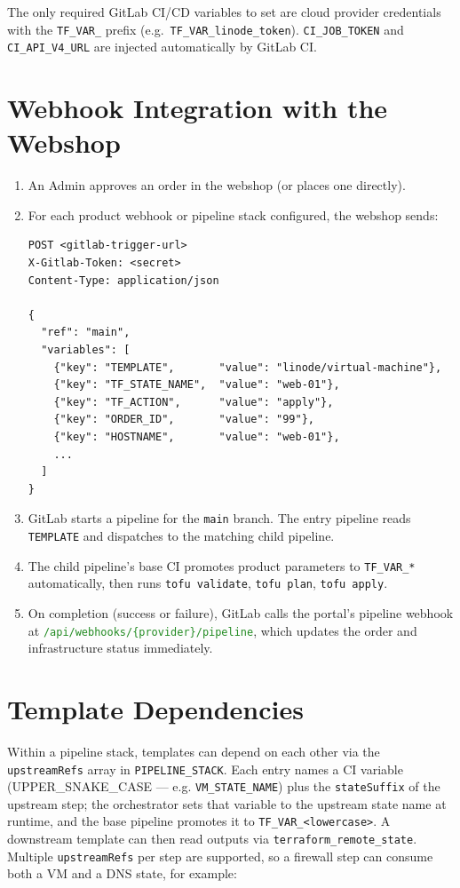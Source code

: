 \documentclass[12pt,a4paper,twoside]{report}
\newcommand{\notebox}[1]{\begin{tcolorbox}[noteboxstyle]#1\end{tcolorbox}}
\newcommand{\code}[1]{\texttt{#1}}
\newcommand{\route}[1]{\texttt{\textcolor{ForestGreen}{#1}}}
\begin{document}
\notebox{The only required GitLab CI/CD variables to set are cloud
provider credentials with the \code{TF\_VAR\_} prefix
(e.g.\ \code{TF\_VAR\_linode\_token}). \code{CI\_JOB\_TOKEN} and
\code{CI\_API\_V4\_URL} are injected automatically by GitLab CI.}

\section{Webhook Integration with the Webshop}
\label{sec:webhook}

\begin{enumerate}
  \item An Admin approves an order in the webshop (or places one
        directly).
  \item For each product webhook or pipeline stack configured, the
        webshop sends:
\begin{lstlisting}[style=bash]
POST <gitlab-trigger-url>
X-Gitlab-Token: <secret>
Content-Type: application/json

{
  "ref": "main",
  "variables": [
    {"key": "TEMPLATE",       "value": "linode/virtual-machine"},
    {"key": "TF_STATE_NAME",  "value": "web-01"},
    {"key": "TF_ACTION",      "value": "apply"},
    {"key": "ORDER_ID",       "value": "99"},
    {"key": "HOSTNAME",       "value": "web-01"},
    ...
  ]
}
\end{lstlisting}
  \item GitLab starts a pipeline for the \code{main} branch.
        The entry pipeline reads \code{TEMPLATE} and dispatches to the
        matching child pipeline.
  \item The child pipeline's base CI promotes product parameters to
        \code{TF\_VAR\_*} automatically, then runs
        \code{tofu validate}, \code{tofu plan}, \code{tofu apply}.
  \item On completion (success or failure), GitLab calls the portal's
        pipeline webhook at
        \route{/api/webhooks/\{provider\}/pipeline}, which updates the
        order and infrastructure status immediately.
\end{enumerate}

\section{Template Dependencies}

Within a pipeline stack, templates can depend on each other via the
\code{upstreamRefs} array in \code{PIPELINE\_STACK}. Each entry names a
CI variable (UPPER\_SNAKE\_CASE — e.g. \code{VM\_STATE\_NAME}) plus
the \code{stateSuffix} of the upstream step; the orchestrator sets that
variable to the upstream state name at runtime, and the base pipeline
promotes it to \code{TF\_VAR\_<lowercase>}. A downstream template can
then read outputs via \code{terraform\_remote\_state}. Multiple
\code{upstreamRefs} per step are supported, so a firewall step can
consume both a VM and a DNS state, for example:
\end{document}
